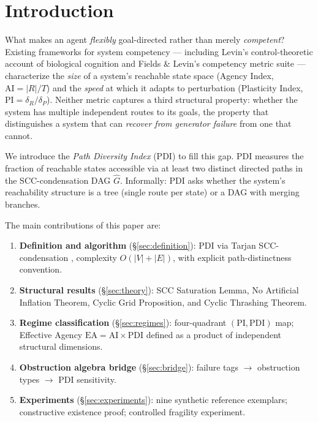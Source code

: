 \documentclass[11pt,letterpaper]{article}
\theoremstyle{plain}
\theoremstyle{definition}
\theoremstyle{remark}
\newcommand{\PDI}{\mathrm{PDI}}
\newcommand{\AI}{\mathrm{AI}}
\newcommand{\PI}{\mathrm{PI}}
\newcommand{\EA}{\mathrm{EA}}
\newcommand{\Ghat}{\hat{G}}
\begin{document}
\section{Introduction}

What makes an agent \emph{flexibly} goal-directed rather than merely
\emph{competent}?
Existing frameworks for system competency --- including Levin's
control-theoretic account of biological cognition
\cite{levin2019regenerative,levin2022technological} and
Fields \& Levin's competency metric suite \cite{fields2022competency} ---
characterize the \emph{size} of a system's reachable state space (Agency
Index, $\AI = |R|/T$) and the \emph{speed} at which it adapts to perturbation
(Plasticity Index, $\PI = \delta_R/\delta_P$).
Neither metric captures a third structural property:
whether the system has multiple independent routes to its goals,
the property that distinguishes a system that can
\emph{recover from generator failure} from one that cannot.

We introduce the \emph{Path Diversity Index} ($\PDI$) to fill this gap.
$\PDI$ measures the fraction of reachable states accessible via at least
two distinct directed paths in the SCC-condensation DAG $\Ghat$.
Informally: $\PDI$ asks whether the system's reachability structure is a
tree (single route per state) or a DAG with merging branches.

The main contributions of this paper are:
\begin{enumerate}
  \item \textbf{Definition and algorithm} (\S\ref{sec:definition}):
    $\PDI$ via Tarjan SCC-condensation \cite{tarjan1972depth,cormen2022introduction},
    complexity $O(|V|+|E|)$, with explicit path-distinctness convention.
  \item \textbf{Structural results} (\S\ref{sec:theory}):
    SCC Saturation Lemma, No Artificial Inflation Theorem,
    Cyclic Grid Proposition, and Cyclic Thrashing Theorem.
  \item \textbf{Regime classification} (\S\ref{sec:regimes}):
    four-quadrant $(\PI, \PDI)$ map; Effective Agency $\EA = \AI \times \PDI$
    defined as a product of independent structural dimensions.
  \item \textbf{Obstruction algebra bridge} (\S\ref{sec:bridge}):
    failure tags $\to$ obstruction types $\to$ $\PDI$ sensitivity.
  \item \textbf{Experiments} (\S\ref{sec:experiments}):
    nine synthetic reference exemplars; constructive existence proof;
    controlled fragility experiment.
\end{enumerate}
\end{document}
